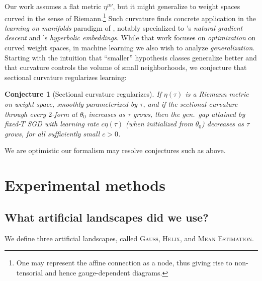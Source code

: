 \documentclass[final,12pt]{colt2021} %
\newtheorem{conj}{Conjecture}
\newcommand{\Gauss}{\textsc{Gauss}}
\newcommand{\Helix}{\textsc{Helix}}
\newcommand{\MeanEstimation}{\textsc{Mean Estimation}}
\begin{document}
        Our work assumes a flat metric $\eta^{\mu\nu}$, but it might
        generalize to weight spaces curved in the sense of Riemann.\footnote{
            One may represent the affine connection as a node, thus giving
            rise to non-tensorial and hence gauge-dependent diagrams.
        }  Such curvature finds concrete application in the \emph{learning on
        manifolds} paradigm of \cite{ab07, zh16}, notably specialized to
        \cite{am98}'s \emph{natural gradient descent} and \cite{ni17}'s
        \emph{hyperbolic embeddings}.  While that work focuses on
        \emph{optimization} on curved weight spaces, in machine learning we
        also wish to analyze \emph{generalization}.
        Starting with the intuition that ``smaller'' hypothesis classes
        generalize better and that curvature controls the volume of small
        neighborhoods, we conjecture that sectional curvature regularizes
        learning:
        \begin{conj}[Sectional curvature regularizes]
            If $\eta(\tau)$ is a Riemann metric on weight space, smoothly
            parameterized by $\tau$, and if the sectional curvature through
            every $2$-form at $\theta_0$ increases as $\tau$ grows, then
            the gen.\ gap attained by fixed-$T$ SGD with learning rate $c
            \eta(\tau)$ (when initialized from $\theta_0$) decreases as $\tau$
            grows, for all sufficiently small $c>0$.
        \end{conj}
        We are optimistic our formalism may resolve conjectures such as above.


\newpage
\section{Experimental methods}\label{appendix:experiments}

    \subsection{What artificial landscapes did we use?}             \label{appendix:artificial}

        We define three artificial landscapes, called
        \Gauss, \Helix, and \MeanEstimation.
\end{document}
